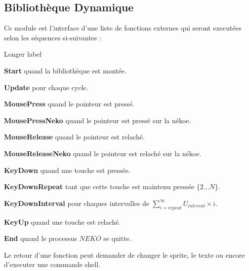 \documentclass{report}
\newcommand{\program}{\textit{NEKO}}
\begin{document}

\subsection{Bibliothèque Dynamique}

Ce module est l'interface d'une liste de fonctions externes qui seront executées selon les séquences si-suivantes :

\begin{labeling}{Longer label\quad}
	\item[\textbf{Start} quand la bibliothèque est montée.]
	\item[\textbf{Update} pour chaque cycle.]
	\item[\textbf{MousePress} quand le pointeur est pressé.]
	\item[\textbf{MousePressNeko} quand le pointeur est pressé sur la nékoe.]
	\item[\textbf{MouseRelease} quand le pointeur est relaché.]
	\item[\textbf{MouseReleaseNeko} quand le pointeur est relaché sur la nékoe.]
	\item[\textbf{KeyDown} quand une touche est pressée.]
	\item[\textbf{KeyDownRepeat} tant que cette touche est maintenu pressée $\{2\dots{}N\}$.]
	\item[\textbf{KeyDownInterval} pour chaques intervalles de $\sum_{i=repeat}^{\infty} U_{interval}\times{}i$.]
	\item[\textbf{KeyUp} quand une touche est relaché.]
	\item[\textbf{End} quand le processus $\program$ se quitte.]
\end{labeling}

Le retour d'une fonction peut demander de changer le sprite, le texte ou encore d'executer une commande shell.
\end{document}
